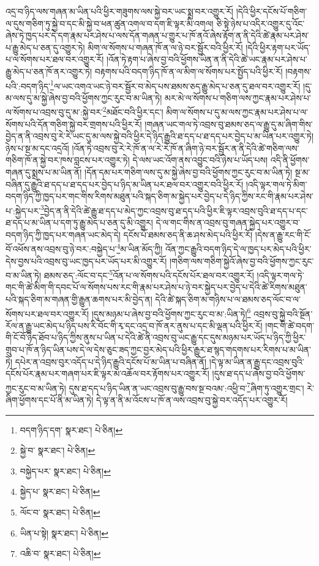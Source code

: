 འདྲ་བ་ཉིད་ལས་གཞན་མ་ཡིན་པའི་ཕྱིར་གཟུགས་ལས་སྐྱེ་བར་ཡང་སྨྲ་བར་འགྱུར་རོ། །དེའི་ཕྱིར་དངོས་པོ་གཅིག་ལ་དུས་གཅིག་ཏུ་སྐྱེ་བ་དང་མི་སྐྱེ་བ་ཕན་ཚུན་འགལ་བ་དག་ཇི་ལྟར་མི་འགལ། ཅི་སྟེ་ཉེས་པ་འདིར་འགྱུར་དུ་འོང་ཞེས་ཏེ་ཁྱད་པར་དེ་དག་རྣམ་པར་ཤེས་པ་ལས་དོན་གཞན་པ་གྱུར་པ་ཁོ་ནའོ་ཞེས་རྟོག་ན་ནི་དེའི་ཚེ་རྣམ་པར་ཤེས་པ་རྒྱུ་མེད་པ་ཅན་དུ་འགྱུར་ཏེ། མིག་ལ་སོགས་པ་གཞན་ཁོ་ན་ལ་ཉེ་བར་སྦྱོར་བའི་ཕྱིར་རོ། །དེའི་ཕྱིར་རྟག་པར་ཡོད་པ་ལ་སོགས་པར་ཐལ་བར་འགྱུར་རོ། །འོན་ཏེ་རྟག་པ་ཞེས་བྱ་བའི་ཕྱོགས་ཡིན་ན་ནི་དེའི་ཚེ་ཡང་རྣམ་པར་ཤེས་པ་རྒྱུ་མེད་པ་ཅན་ཁོ་ནར་འགྱུར་ཏེ། བརྟགས་པའི་བདག་ཉིད་ཁོ་ན་ལ་མིག་ལ་སོགས་པར་སྤྱོད་པའི་ཕྱིར་རོ། །བརྟགས་པའི་:བདག་ཉིད་\footnote{བདག་ཉིད་དག་  སྣར་ཐང་།  པེ་ཅིན། }ལ་ཡང་འགའ་ཡང་ཉེ་བར་སྦྱོར་བ་མེད་པས་ཐམས་ཅད་རྒྱུ་མེད་པ་ཅན་དུ་ཐལ་བར་འགྱུར་རོ། །དུ་མ་ལས་དུ་མ་སྐྱེ་ཞེས་བྱ་བའི་ཕྱོགས་ཀྱང་རུང་བ་མ་ཡིན་ཏེ། མར་མེ་ལ་སོགས་པ་གཅིག་ལས་ཀྱང་རྣམ་པར་ཤེས་པ་ལ་སོགས་པ་འབྲས་བུ་དུ་མ་:སྐྱེ་བར་\footnote{སྐྱེ་བ་  སྣར་ཐང་།  པེ་ཅིན། }མཐོང་བའི་ཕྱིར་དང་། མིག་ལ་སོགས་པ་དུ་མ་ལས་ཀྱང་རྣམ་པར་ཤེས་པ་ལ་སོགས་པའི་དོན་གཅིག་སྐྱེ་བར་གྲགས་པའི་ཕྱིར་རོ། །གཞན་ཡང་གལ་ཏེ་འབྲས་བུ་ཐམས་ཅད་ལ་རྒྱུ་དུ་མ་ཞིག་གིས་བྱེད་ན་ནི་འབྲས་བུ་རེ་རེ་ཡང་དུ་མ་ལས་སྐྱེ་བའི་ཕྱིར་དེ་ཉིད་རྒྱུའི་ཐ་དད་པ་ཐ་དད་པར་བྱེད་པ་མ་ཡིན་པར་འགྱུར་ཏེ། ཉེས་པ་སྔ་མ་དང་འདྲའོ། །འོན་ཏེ་འབྲས་བུ་རེ་རེ་ཁོ་ན་ལ་རེ་རེ་ཁོ་ན་ཞིག་ཉེ་བར་སྦྱོར་ན་ནི་དེའི་ཚེ་གཅིག་ལས་གཅིག་ཁོ་ན་སྐྱེ་བར་ཁས་བླངས་པར་འགྱུར་ཏེ། དེ་ལས་ཡང་འོག་ནས་འབྱུང་བའི་ཉེས་པ་ཡོད་པས། འདི་ནི་ཕྱོགས་གཞན་དུ་སྨྲས་པ་མ་ཡིན་ནོ། །དོན་དམ་པར་གཅིག་ལས་དུ་མ་སྐྱེ་ཞེས་བྱ་བའི་ཕྱོགས་ཀྱང་རུང་བ་མ་ཡིན་ཏེ། སྔ་མ་བཞིན་དུ་རྒྱུའི་ཐ་དད་པ་ཐ་དད་པར་བྱེད་པ་ཉིད་མ་ཡིན་པར་ཐལ་བར་འགྱུར་བའི་ཕྱིར་རོ། །འདི་ལྟར་གལ་ཏེ་མིག་བདག་ཉིད་ཀྱི་ཁྱད་པར་གང་གིས་རིགས་མཐུན་པའི་སྐད་ཅིག་མ་སྐྱེད་པར་བྱེད་པ་དེ་ཉིད་ཀྱིས་རང་གི་རྣམ་པར་ཤེས་པ་:སྐྱེད་པར་\footnote{བསྐྱེད་པར་  སྣར་ཐང་།  པེ་ཅིན། }བྱེད་ན་ནི་དེའི་ཚེ་རྒྱུ་ཐ་དད་པ་མེད་ཀྱང་འབྲས་བུ་ཐ་དད་པའི་ཕྱིར་ཇི་ལྟར་འབྲས་བུའི་ཐ་དད་པ་དང་ཐ་དད་པ་མ་ཡིན་པ་དག་ཏུ་རྒྱུ་མེད་པ་ཅན་དུ་མི་འགྱུར། དེ་ལ་གང་གིས་ན་འབྲས་བུ་གཞན་སྐྱེད་པར་འགྱུར་བ་བདག་ཉིད་ཀྱི་ཁྱད་པར་གཞན་ཡང་མེད་དེ། དངོས་པོ་ཐམས་ཅད་ནི་ཆ་ཤས་མེད་པའི་ཕྱིར་རོ། །དེས་ན་རྒྱུ་རང་གི་ངོ་བོ་འཕོས་ནས་འབྲས་བུ་ཉེ་བར་:བསྐྱེད་པ་\footnote{སྐྱེད་པ་  སྣར་ཐང་།  པེ་ཅིན། }མ་ཡིན་མོད་ཀྱི། འོན་ཀྱང་རྒྱུའི་བདག་ཉིད་དེ་ལ་ཁྱད་པར་མེད་པའི་ཕྱིར་དེས་བྱས་པའི་འབྲས་བུ་ཡང་ཁྱད་པར་ཡོད་པར་མི་འགྱུར་རོ། །གཅིག་ལས་གཅིག་སྐྱེའོ་ཞེས་བྱ་བའི་ཕྱོགས་ཀྱང་རུང་བ་མ་ཡིན་ཏེ། ཐམས་ཅད་:ལོང་བ་དང་\footnote{ལོང་བ་  སྣར་ཐང་།  པེ་ཅིན། }འོན་པ་ལ་སོགས་པའི་དངོས་པོར་ཐལ་བར་འགྱུར་རོ། །འདི་ལྟར་གལ་ཏེ་གང་གི་ཚེ་མིག་གི་དབང་པོ་ལ་སོགས་པས་རང་གི་རྣམ་པར་ཤེས་པ་ཉེ་བར་སྐྱེད་པར་བྱེད་པ་དེའི་ཚེ་རིགས་མཐུན་པའི་སྐད་ཅིག་མ་གཞན་གྱི་རྒྱུན་ཆགས་པར་མི་བྱེད་ན། དེའི་ཚེ་སྐད་ཅིག་མ་གཉིས་པ་ལ་ཐམས་ཅད་ལོང་བ་ལ་སོགས་པར་ཐལ་བར་འགྱུར་རོ། །དུས་མཉམ་པ་ཞེས་བྱ་བའི་ཕྱོགས་ཀྱང་རུང་བ་མ་:ཡིན་ཏེ།\footnote{ཡིན་པ་སྟེ།  སྣར་ཐང་།  པེ་ཅིན། } འབྲས་བུ་སྐྱེ་བའི་སྔོན་རོལ་ན་རྒྱུ་ཡང་མེད་པ་ཉིད་པས་རི་བོང་གི་རྭ་དང་འདྲ་བ་ཁོ་ནར་ནུས་པ་དང་མི་ལྡན་པའི་ཕྱིར་རོ། །གང་གི་ཚེ་བདག་གི་ངོ་བོ་ཉིད་ཐོབ་པ་ཉིད་ཀྱིས་ནུས་པ་ཡིན་པ་དེའི་ཚེ་ནི་འབྲས་བུ་ཡང་རྒྱུ་དང་དུས་མཉམ་པར་ཡོད་པ་ཉིད་ཀྱི་ཕྱིར་གྲུབ་པ་ཁོ་ན་ཉིད་ཡིན་པས་དེ་ལ་དེས་ཅུང་ཟད་ཀྱང་བྱར་མེད་པའི་ཕྱིར་རྒྱུར་ཐ་སྙད་གདགས་པར་རིགས་པ་མ་ཡིན་ཏེ། དཔེར་ན་འབྲས་བུར་འདོད་པ་དེ་ཉིད་རྒྱུའི་དངོས་པོ་མ་ཡིན་པ་བཞིན་ནོ། །དེ་ལྟ་མ་ཡིན་ན་རྒྱུ་དང་འབྲས་བུའི་དངོས་པོར་རྣམ་པར་གཞག་པར་ཇི་ལྟར་མ་འཆོལ་བར་རྟོགས་པར་འགྱུར་རོ། །དུས་ཐ་དད་པ་ཞེས་བྱ་བའི་ཕྱོགས་ཀྱང་རུང་བ་མ་ཡིན་ཏེ། དུས་ཐ་དད་པ་ཉིད་ཡིན་ན་ཡང་འབྲས་བུ་རྒྱུ་བས་སྔ་བའམ་:འཕྱི་བ་\footnote{འཆི་བ་  སྣར་ཐང་།  པེ་ཅིན། }ཞིག་ཏུ་འགྱུར་གྲང་། རེ་ཞིག་ཕྱོགས་དང་པོ་ནི་མ་ཡིན་ཏེ། དེ་ལྟ་ན་ནི་མ་འོངས་པ་ཁོ་ན་ལས་འབྲས་བུ་སྐྱེ་བར་འདོད་པར་འགྱུར་རོ། 